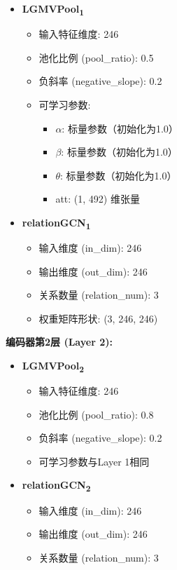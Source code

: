 \begin{itemize}
    \item \textbf{LGMVPool\textsubscript{1}}
    \begin{itemize}
        \item 输入特征维度: 246
        \item 池化比例 (pool\_ratio): 0.5
        \item 负斜率 (negative\_slope): 0.2
        \item 可学习参数:
        \begin{itemize}
            \item $\alpha$: 标量参数（初始化为1.0）
            \item $\beta$: 标量参数（初始化为1.0）
            \item $\theta$: 标量参数（初始化为1.0）
            \item att: (1, 492) 维张量
        \end{itemize}
    \end{itemize}
    \item \textbf{relationGCN\textsubscript{1}}
    \begin{itemize}
        \item 输入维度 (in\_dim): 246
        \item 输出维度 (out\_dim): 246
        \item 关系数量 (relation\_num): 3
        \item 权重矩阵形状: (3, 246, 246)
    \end{itemize}
\end{itemize}

\textbf{编码器第2层 (Layer 2):}

\begin{itemize}
    \item \textbf{LGMVPool\textsubscript{2}}
    \begin{itemize}
        \item 输入特征维度: 246
        \item 池化比例 (pool\_ratio): 0.8
        \item 负斜率 (negative\_slope): 0.2
        \item 可学习参数与Layer 1相同
    \end{itemize}
    \item \textbf{relationGCN\textsubscript{2}}
    \begin{itemize}
        \item 输入维度 (in\_dim): 246
        \item 输出维度 (out\_dim): 246
        \item 关系数量 (relation\_num): 3
    \end{itemize}
\end{itemize}

